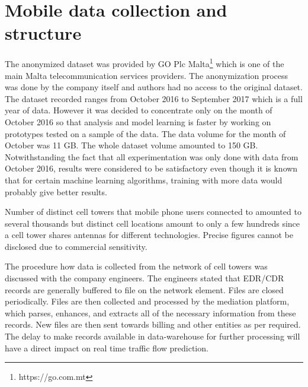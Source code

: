 \documentclass[12pt, a4paper]{report}
\theoremstyle{definition}
\theoremstyle{definition}%
\theoremstyle{definition}%
\theoremstyle{definition}%
\theoremstyle{definition}%
\theoremstyle{definition}%
\begin{document}
\section{Mobile data collection and structure} \label{section:methodology:mobile_data_collection_structure}

The anonymized dataset was provided by GO Plc Malta\footnote{https://go.com.mt} which is one of the main Malta telecommunication services providers. The anonymization process was done by the company itself and authors had no access to the original dataset. The dataset recorded ranges from October 2016 to September 2017 which is a full year of data. However it was decided to concentrate only on the month of October 2016 so that analysis and model learning is faster by working on prototypes tested on a sample of the data. The data volume for the month of October was 11 GB. The whole dataset volume amounted to 150 GB. Notwithstanding the fact that all experimentation was only done with data from October 2016, results were considered to be satisfactory even though it is known that for certain machine learning algorithms, training with more data would probably give better results. 

Number of distinct cell towers that mobile phone users connected to amounted to several thousands but distinct cell locations amount to only a few hundreds since a cell tower shares antennas for different technologies. Precise figures cannot be disclosed due to commercial sensitivity.

The procedure how data is collected from the network of cell towers was discussed with the company engineers. The engineers stated that EDR/CDR records are generally buffered to file on the network element. Files are closed periodically. Files are then collected and processed by the mediation platform, which parses, enhances, and extracts all of the necessary information from these records. New files are then sent towards billing and other entities as per required. The delay to make records available in data-warehouse for further processing will have a direct impact on real time traffic flow prediction.
\end{document}
